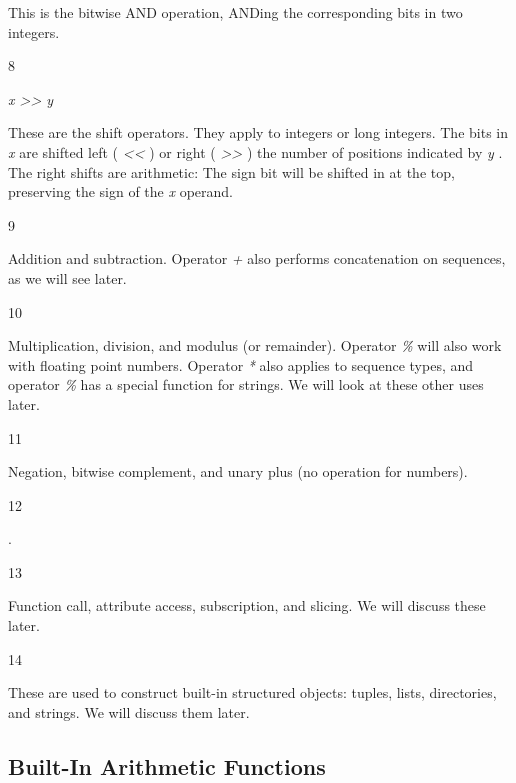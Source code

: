 This is the bitwise AND operation,
ANDing the corresponding bits in two integers.

8



 \emph{x
\textgreater{}\textgreater{} y}

These are the shift operators.
They apply to integers or long integers. The bits in \emph{x} are
shifted left ( \emph{\textless{}\textless{}} ) or right (
\emph{\textgreater{}\textgreater{}} ) the number of positions indicated
by \emph{y} . The right shifts are arithmetic: The sign bit will be
shifted in at the top, preserving the sign of the \emph{x} operand.

9





Addition and subtraction. Operator
\emph{+} also performs concatenation on sequences, as we will see later.

10







Multiplication, division, and
modulus (or remainder). Operator \emph{\%} will also work with floating
point numbers. Operator \emph{*} also applies to sequence types, and
operator \emph{\%} has a special function for strings. We will look at
these other uses later.

11







Negation, bitwise complement, and
unary plus (no operation for numbers).

12



 .

13









Function call, attribute access,
subscription, and slicing. We will discuss these later.

14









These are used to construct
built-in structured objects: tuples, lists, directories, and strings. We
will discuss them later.

\subsection{Built-In Arithmetic Functions}
\label{built-in-arithmetic-functions}

